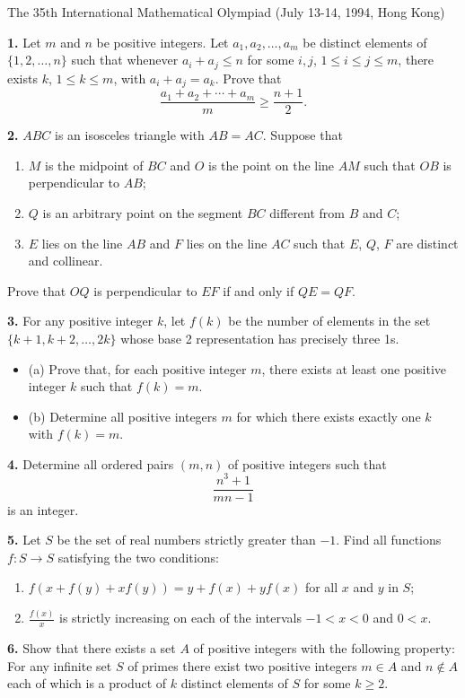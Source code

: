 \documentclass[12pt]{article}
\begin{document}
The 35th International Mathematical Olympiad (July 13-14, 1994, Hong Kong)

{\noindent \bf 1.}
Let $m$ and $n$ be positive integers. Let $a_1, a_2, \dots, a_m$ 
be distinct elements of $\{1, 2, \dots, n\}$ such that whenever $a_i + 
a_j \leq n$ for some $i, j$, $1 \leq i \leq j \leq m$, there exists $k$, 
$1 \leq k \leq m$, with $a_i + a_j = a_k$. Prove that
\[
\frac{a_1 + a_2 + \cdots + a_m}{m} \geq \frac{n+1}{2}.
\]

{\noindent \bf 2.}
$ABC$ is an isosceles triangle with $AB = AC$. Suppose that
\begin{enumerate}
	\item  $M$ is the midpoint of $BC$ and $O$ is the point on the line 
	$AM$ such that $OB$ is perpendicular to $AB$;

	\item  $Q$ is an arbitrary point on the segment $BC$ different from 
	$B$ and $C$;

	\item  $E$ lies on the line $AB$ and $F$ lies on the line $AC$ 
	such that $E$, $Q$, $F$ are distinct and collinear.
\end{enumerate}
Prove that $OQ$ is perpendicular to $EF$ if and only if $QE = QF$.

{\noindent \bf 3.}
For any positive integer $k$, let $f(k)$ be the number of 
elements in the set $\{k+1, k+2, \dots, 2k\}$ whose base 2 representation 
has precisely three 1s.
\begin{itemize}
	\item  (a) Prove that, for each positive integer $m$, there exists at 
	least one positive integer $k$ such that $f(k) = m$.

	\item  (b) Determine all positive integers $m$ for which there exists 
	exactly one $k$ with $f(k) = m$.
\end{itemize}

{\noindent \bf 4.}
Determine all ordered pairs $(m, n)$ of positive integers such that
\[
\frac{n^3 + 1}{mn - 1}
\]
is an integer.

{\noindent \bf 5.}
Let $S$ be the set of real numbers strictly greater than $-1$. 
Find all functions $f: S \to S$ satisfying the two conditions:
\begin{enumerate}
	\item  $f(x + f(y) + xf(y)) = y + f(x) + yf(x)$ for all $x$ and $y$ in $S$;

	\item  $\frac{f(x)}{x}$ is strictly increasing on each of the intervals 
	$-1 < x < 0$ and $0 < x$.
\end{enumerate}

{\noindent \bf 6.}
Show that there exists a set $A$ of positive integers with the 
following property: For any infinite set $S$ of primes there exist two 
positive integers $m \in A$ and $n \notin A$ each of which is a product 
of $k$ distinct elements of $S$ for some $k \geq 2$.
\end{document}
